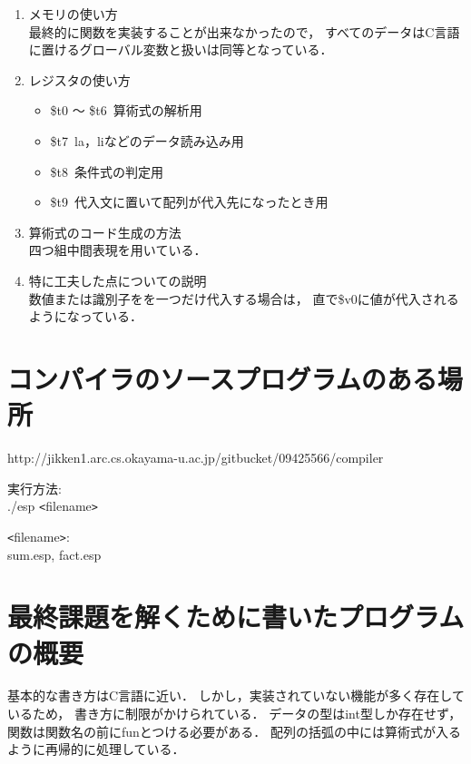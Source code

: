 \documentclass[11pt,a4j]{jarticle}
\begin{document}
\begin{enumerate}
\item {メモリの使い方}\\
  最終的に関数を実装することが出来なかったので，
すべてのデータはC言語に置けるグローバル変数と扱いは同等となっている．
\item {レジスタの使い方}
  \begin{itemize}
  \item \$t0 ～ \$t6~算術式の解析用
  \item \$t7~la，liなどのデータ読み込み用
  \item \$t8~条件式の判定用
  \item \$t9~代入文に置いて配列が代入先になったとき用
  \end{itemize}
\item {算術式のコード生成の方法}\\
  四つ組中間表現を用いている．
\item {特に工夫した点についての説明}\\
  数値または識別子をを一つだけ代入する場合は，
  直で\$v0に値が代入されるようになっている．
\end{enumerate}




\section{コンパイラのソースプログラムのある場所}
http://jikken1.arc.cs.okayama-u.ac.jp/gitbucket/09425566/compiler

実行方法:\\
\hspace{24pt}./esp \verb|<|filename\verb|>|

\verb|<|filename\verb|>|:\\
\hspace{24pt} sum.esp, fact.esp\\



\section{最終課題を解くために書いたプログラムの概要}

基本的な書き方はC言語に近い．
しかし，実装されていない機能が多く存在しているため，
書き方に制限がかけられている．
データの型はint型しか存在せず，関数は関数名の前にfunとつける必要がある．
配列の括弧の中には算術式が入るように再帰的に処理している．
\end{document}
